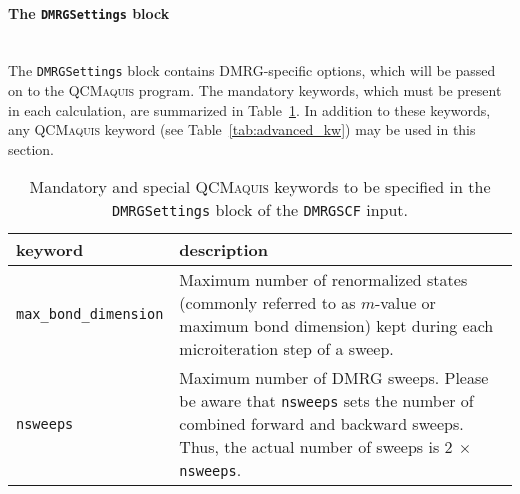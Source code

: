 \documentclass[bibliography=totoc,12pt,a4paper]{scrartcl}
\newcommand{\qcm}{\textsc{QCMaquis}}
\newcommand{\kwd}[1]{\texttt{#1}}
\begin{document}
\paragraph{The \kwd{DMRGSettings} block}\mbox{}\\

The \kwd{DMRGSettings} block contains DMRG-specific options, which will be passed on to the \qcm{} program.
The mandatory keywords, which must be present in each calculation, are summarized in Table~\ref{tab:standard_kw}. 
In addition to these keywords, any \qcm{} keyword (see Table~\ref{tab:advanced_kw}) may be used in this section.

\begin{table}[h]
  \caption{Mandatory and special \qcm{} keywords to be specified in the \kwd{DMRGSettings} block of the \kwd{DMRGSCF} input.}
  \begin{tabular}{ll}
    \toprule
     keyword & description \\
     \midrule
     \multirow{3}{*}{\texttt{max\_bond\_dimension}} & 
     \multirow{3}{11cm}{Maximum number of renormalized states (commonly referred to as $m$-value or maximum bond dimension) kept during each microiteration step of a sweep.} \\
       & \\
       & \\
     \multirow{4}{*}{\texttt{nsweeps}} & 
     \multirow{4}{11cm}{Maximum number of DMRG sweeps. Please be aware that \texttt{nsweeps} sets the number of combined forward and backward sweeps. Thus, the actual number of sweeps is $2\ \times $ \texttt{nsweeps}.} \\
       & \\
       & \\
       & \\
     \bottomrule
  \end{tabular}
  \label{tab:standard_kw}
\end{table}
\end{document}

